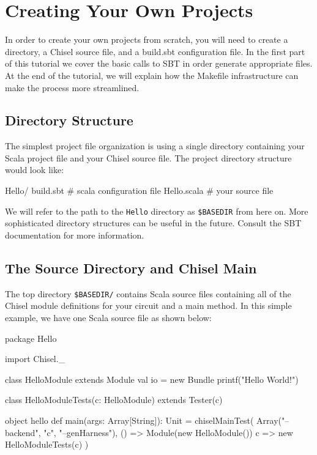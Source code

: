 \section{Creating Your Own Projects}

In order to create your own projects from scratch, you will need to create a directory, a Chisel source file, and a build.sbt configuration file. In the first part of this tutorial we cover the basic calls to SBT in order generate appropriate files. At the end of the tutorial, we will explain how the Makefile infrastructure can make the process more streamlined.

\subsection{Directory Structure}

The simplest project file organization is using a single directory containing your Scala project file and your Chisel source file.  The project directory structure would look like:

\begin{bash}
Hello/
  build.sbt   # scala configuration file
  Hello.scala # your source file
\end{bash}

We will refer to the path to the \verb+Hello+ directory as \verb+$BASEDIR+ from here on.  More sophisticated directory structures can be useful in the future.  Consult the SBT documentation for more information.

\subsection{The Source Directory and Chisel Main}

The top directory \verb+$BASEDIR/+ contains Scala source files containing all of the Chisel module definitions for your circuit and a main method.  In this simple example, we have one Scala source file as shown below:

\begin{scala}
package Hello

import Chisel._

class HelloModule extends Module {
  val io = new Bundle {}
  printf("Hello World!\n")
}

class HelloModuleTests(c: HelloModule) 
    extends Tester(c) {
}

object hello {
  def main(args: Array[String]): Unit = {
    chiselMainTest(
      Array("--backend", "c", "--genHarness"),
      () => Module(new HelloModule()) {
        c => new HelloModuleTests(c)
      })
  }
}
\end{scala}

